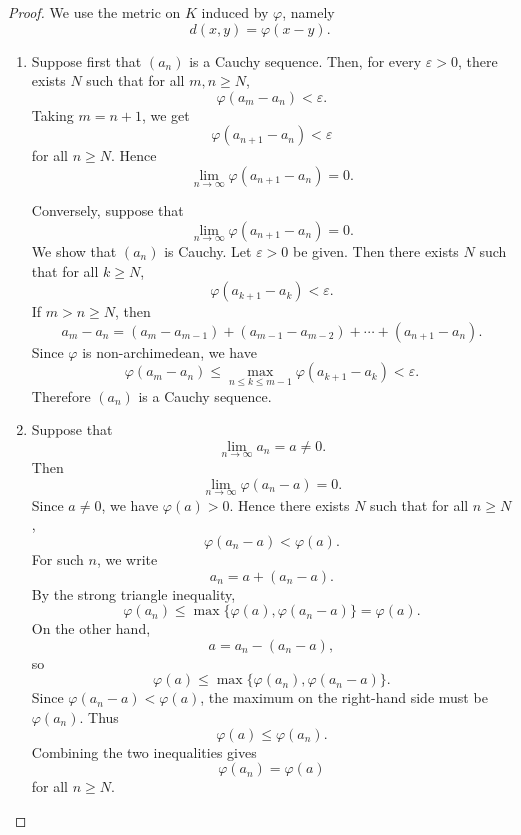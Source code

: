     \begin{proof}
        We use the metric on $K$ induced by $\varphi$, namely
        \[
            d(x,y)=\varphi(x-y).
        \]
        
        \begin{enumerate}
            \item Suppose first that $(a_n)$ is a Cauchy sequence. Then, for every $\varepsilon>0$,
            there exists $N$ such that for all $m,n\geq N$,
            \[
                \varphi(a_m-a_n)<\varepsilon.
            \]
            Taking $m=n+1$, we get
            \[
                \varphi(a_{n+1}-a_n)<\varepsilon
            \]
            for all $n\geq N$. Hence
            \[
                \lim_{n\to\infty}\varphi(a_{n+1}-a_n)=0.
            \]
        
            Conversely, suppose that
            \[
                \lim_{n\to\infty}\varphi(a_{n+1}-a_n)=0.
            \]
            We show that $(a_n)$ is Cauchy. Let $\varepsilon>0$ be given. Then there exists
            $N$ such that for all $k\geq N$,
            \[
                \varphi(a_{k+1}-a_k)<\varepsilon.
            \]
            If $m>n\geq N$, then
            \[
                a_m-a_n
                =
                (a_m-a_{m-1})+(a_{m-1}-a_{m-2})+\cdots+(a_{n+1}-a_n).
            \]
            Since $\varphi$ is non-archimedean, we have
            \[
                \varphi(a_m-a_n)
                \leq
                \max_{n\leq k\leq m-1}\varphi(a_{k+1}-a_k)
                <
                \varepsilon.
            \]
            Therefore $(a_n)$ is a Cauchy sequence.
        
            \item Suppose that
            \[
                \lim_{n\to\infty}a_n=a\neq 0.
            \]
            Then
            \[
                \lim_{n\to\infty}\varphi(a_n-a)=0.
            \]
            Since $a\neq 0$, we have $\varphi(a)>0$. Hence there exists $N$ such that for all
            $n\geq N$,
            \[
                \varphi(a_n-a)<\varphi(a).
            \]
            For such $n$, we write
            \[
                a_n=a+(a_n-a).
            \]
            By the strong triangle inequality,
            \[
                \varphi(a_n)
                \leq
                \max\{\varphi(a),\varphi(a_n-a)\}
                =
                \varphi(a).
            \]
            On the other hand,
            \[
                a=a_n-(a_n-a),
            \]
            so
            \[
                \varphi(a)
                \leq
                \max\{\varphi(a_n),\varphi(a_n-a)\}.
            \]
            Since $\varphi(a_n-a)<\varphi(a)$, the maximum on the right-hand side must be
            $\varphi(a_n)$. Thus
            \[
                \varphi(a)\leq \varphi(a_n).
            \]
            Combining the two inequalities gives
            \[
                \varphi(a_n)=\varphi(a)
            \]
            for all $n\geq N$.
        \end{enumerate}
        \end{proof}
    
